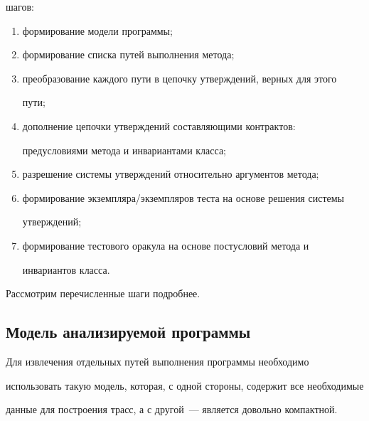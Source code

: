 шагов:


     \begin{enumerate}[(1)]


\item формирование модели программы;


\item формирование списка путей выполнения метода;


\item преобразование каждого пути в цепочку утверждений, верных для этого


пути;


\item дополнение цепочки утверждений составляющими контрактов:


предусловиями метода и инвариантами класса;


\item разрешение системы утверждений относительно аргументов метода;


\item формирование экземпляра/экземпляров теста на основе решения системы


утверждений;


\item формирование тестового оракула на основе постусловий метода и


инвариантов класса.


\end{enumerate}





Рассмотрим перечисленные шаги подробнее.





      \vspace*{-6pt}





      \subsection{Модель анализируемой программы}





     Для извлечения отдельных путей выполнения программы необходимо


использовать такую модель, которая, с одной стороны, содержит все необходимые


данные для построения трасс, а с другой~--- является довольно компактной.


